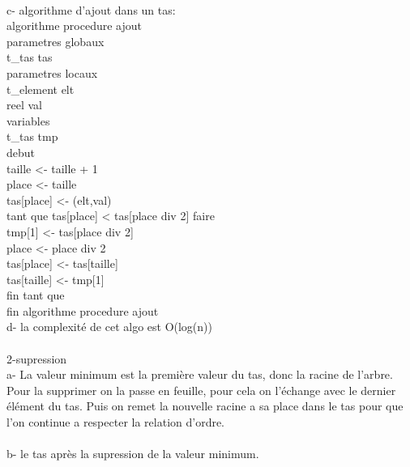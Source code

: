 \documentclass [11pt]{report}
\begin{document}
\vspace{5mm}\\
 c- algorithme d'ajout dans un tas:\\
algorithme procedure ajout\\
\indent parametres globaux\\
\indent \indent t\_tas tas\\
\indent parametres locaux\\
\indent \indent t\_element elt\\
\indent \indent reel val\\
\indent variables\\
\indent \indent t\_tas tmp\\
debut\\
\indent taille <- taille + 1\\
\indent place <- taille\\
\indent tas[place] <- (elt,val)\\
\indent tant que tas[place] < tas[place div 2] faire\\
\indent \indent tmp[1] <- tas[place div 2]\\
\indent \indent place <- place div 2\\
\indent \indent tas[place] <- tas[taille]\\
\indent \indent tas[taille] <- tmp[1]\\
\indent  fin tant que\\
fin algorithme procedure ajout\\
d- la complexit\'e de cet algo est O(log(n))\\
\vspace{7.5mm}\\
2-supression\\
\indent a- La valeur minimum est la premi\`ere valeur du tas, donc la racine de l'arbre. Pour la supprimer on la passe en feuille, pour cela on l'\'echange avec le dernier \'el\'ement du tas. Puis on remet la nouvelle racine a sa place dans le tas pour que l'on continue a respecter la relation d'ordre. \\
\vspace{5mm}\\
\indent b- le tas apr\`es la supression de la valeur minimum.\\
\\
\end{document}

